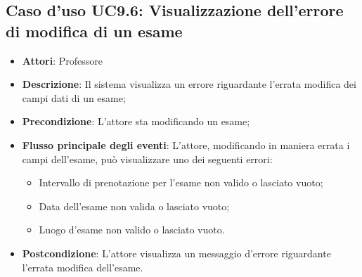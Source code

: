 \subsection{Caso d'uso \texorpdfstring{UC9.6}{UC9.6}: Visualizzazione dell'errore di modifica di un esame}
\begin{itemize}
\item \textbf{Attori}: Professore
\item \textbf{Descrizione}: Il sistema visualizza un errore riguardante l'errata modifica dei campi dati di un esame;
\item \textbf{Precondizione}: L'attore sta modificando un esame;
\item \textbf{Flusso principale degli eventi}: L'attore, modificando in maniera errata i campi dell'esame, può visualizzare uno dei seguenti errori: \begin{itemize}
\item Intervallo di prenotazione per l’esame non valido o lasciato vuoto;
\item Data dell’esame non valida o lasciato vuoto;
\item Luogo d’esame non valido o lasciato vuoto.
\end{itemize}
\item \textbf{Postcondizione}: L'attore visualizza un messaggio d'errore riguardante l'errata modifica dell'esame.
\end{itemize}
